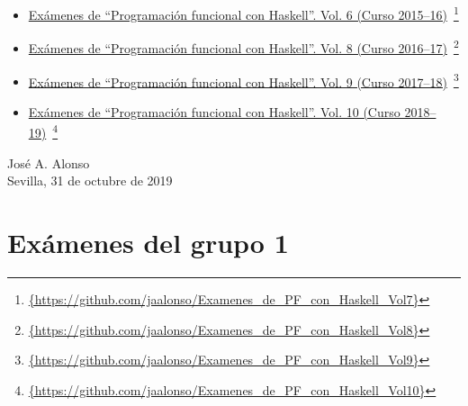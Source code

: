 \documentclass[a4paper,12pt,twoside]{book}
\begin{document}
\begin{itemize}
\item
  \href{https://github.com/jaalonso/Examenes_de_PF_con_Haskell_Vol7}
  {Exámenes de ``Programaci\'on funcional con Haskell''.
    Vol. 6 (Curso 2015--16)}\
    \footnote{\url{{https://github.com/jaalonso/Examenes_de_PF_con_Haskell_Vol7}}}

\item
  \href{https://github.com/jaalonso/Examenes_de_PF_con_Haskell_Vol8}
  {Exámenes de ``Programaci\'on funcional con Haskell''.
    Vol. 8 (Curso 2016--17)}\
    \footnote{\url{{https://github.com/jaalonso/Examenes_de_PF_con_Haskell_Vol8}}}

\item
  \href{https://github.com/jaalonso/Examenes_de_PF_con_Haskell_Vol9}
  {Exámenes de ``Programaci\'on funcional con Haskell''.
    Vol. 9 (Curso 2017--18)}\
    \footnote{\url{{https://github.com/jaalonso/Examenes_de_PF_con_Haskell_Vol9}}}

\item
  \href{https://github.com/jaalonso/Examenes_de_PF_con_Haskell_Vol10}
  {Exámenes de ``Programaci\'on funcional con Haskell''.
    Vol. 10 (Curso 2018--19)}\
    \footnote{\url{{https://github.com/jaalonso/Examenes_de_PF_con_Haskell_Vol10}}}

\end{itemize}
     
\begin{flushright}
  José A. Alonso \\
  Sevilla, 31 de octubre de 2019
\end{flushright}

\chapter{Exámenes del grupo 1}
\chapterauthor{Antonia M. Chávez}
\end{document}
